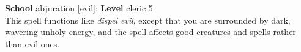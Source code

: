 \textbf{School} abjuration [evil]; \textbf{Level} cleric 5\\
This spell functions like \textit{dispel evil}, except that you are surrounded by dark, wavering unholy energy, and the spell affects good creatures and spells rather than evil ones.\\
